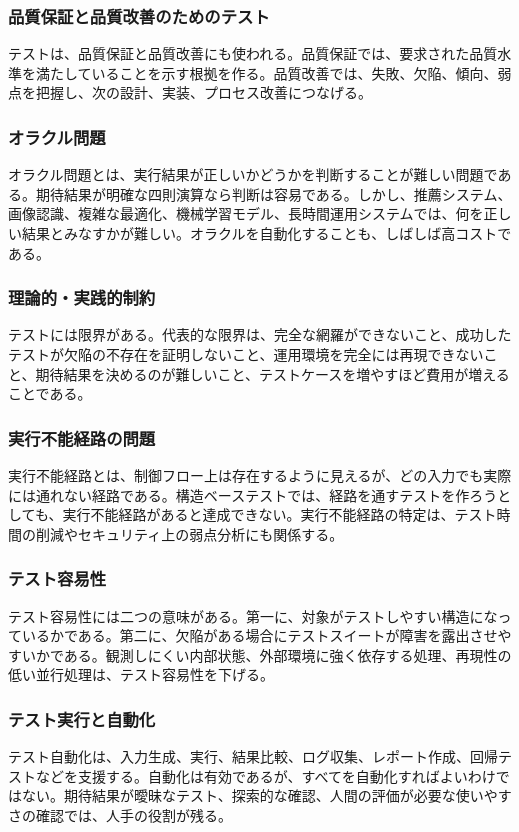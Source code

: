 \documentclass[uplatex,dvipdfmx,a4paper,11pt,nomag]{jsarticle}
\begin{document}
\subsubsection{品質保証と品質改善のためのテスト}
テストは、品質保証と品質改善にも使われる。品質保証では、要求された品質水準を満たしていることを示す根拠を作る。品質改善では、失敗、欠陥、傾向、弱点を把握し、次の設計、実装、プロセス改善につなげる。

\subsubsection{オラクル問題}
オラクル問題とは、実行結果が正しいかどうかを判断することが難しい問題である。期待結果が明確な四則演算なら判断は容易である。しかし、推薦システム、画像認識、複雑な最適化、機械学習モデル、長時間運用システムでは、何を正しい結果とみなすかが難しい。オラクルを自動化することも、しばしば高コストである。

\subsubsection{理論的・実践的制約}
テストには限界がある。代表的な限界は、完全な網羅ができないこと、成功したテストが欠陥の不存在を証明しないこと、運用環境を完全には再現できないこと、期待結果を決めるのが難しいこと、テストケースを増やすほど費用が増えることである。

\subsubsection{実行不能経路の問題}
実行不能経路とは、制御フロー上は存在するように見えるが、どの入力でも実際には通れない経路である。構造ベーステストでは、経路を通すテストを作ろうとしても、実行不能経路があると達成できない。実行不能経路の特定は、テスト時間の削減やセキュリティ上の弱点分析にも関係する。

\subsubsection{テスト容易性}
テスト容易性には二つの意味がある。第一に、対象がテストしやすい構造になっているかである。第二に、欠陥がある場合にテストスイートが障害を露出させやすいかである。観測しにくい内部状態、外部環境に強く依存する処理、再現性の低い並行処理は、テスト容易性を下げる。

\subsubsection{テスト実行と自動化}
テスト自動化は、入力生成、実行、結果比較、ログ収集、レポート作成、回帰テストなどを支援する。自動化は有効であるが、すべてを自動化すればよいわけではない。期待結果が曖昧なテスト、探索的な確認、人間の評価が必要な使いやすさの確認では、人手の役割が残る。
\end{document}

